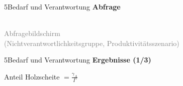\documentclass[xcolor=table,9pt,aspectratio=169]{beamer}
\begin{document}
\begin{frame}{\vspace*{10mm}5\hspace*{1em}Bedarf und Verantwortung}
\textbf{Abfrage}\\
\medskip
\begin{center}
   \\
   \textcolor{gray}{Abfragebildschirm\\(Nichtverantwortlichkeitsgruppe, Produktivitätsszenario)}
\end{center}
\end{frame}


\begin{frame}{\vspace*{10mm}5\hspace*{1em}Bedarf und Verantwortung}
\textbf{Ergebnisse (1/3)}\\
\medskip
\begin{center}
   Anteil Holzscheite $=\frac{\gamma_{A}}{\Gamma}$
\end{center}
\end{frame}
\end{document}
